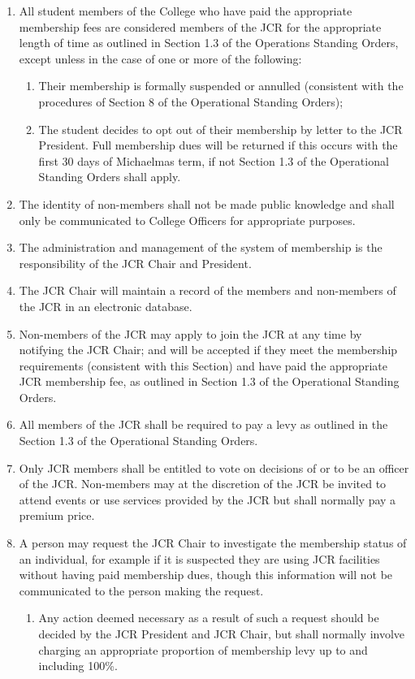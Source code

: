 \begin{enumerate}
    \item All student members of the College who have paid the appropriate membership fees are considered members of the JCR for the appropriate length of time as outlined in Section 1.3 of the Operations Standing Orders, except unless in the case of one or more of the following:
    \begin{enumerate}
        \item Their membership is formally suspended or annulled (consistent with the procedures of Section 8 of the Operational Standing Orders);
        \item The student decides to opt out of their membership by letter to the JCR President. Full membership dues will be returned if this occurs with the first 30 days of Michaelmas term, if not Section 1.3 of the Operational Standing Orders shall apply.
    \end{enumerate}
    \item The identity of non-members shall not be made public knowledge and shall only be communicated to College Officers for appropriate purposes.
    \item  The administration and management of the system of membership is the responsibility of the JCR Chair and President.
    \item The JCR Chair will maintain a record of the members and non-members of the JCR in an electronic database.
    \item Non-members of the JCR may apply to join the JCR at any time by notifying the JCR Chair; and will be accepted if they meet the membership requirements (consistent with this Section) and have paid the appropriate JCR membership fee, as outlined in Section 1.3 of the Operational Standing Orders.
    \item All members of the JCR shall be required to pay a levy as outlined in the Section 1.3 of the Operational Standing Orders. %
    \item Only JCR members shall be entitled to vote on decisions of or to be an officer of the JCR. Non-members may at the discretion of the JCR be invited to attend events or use services provided by the JCR but shall normally pay a premium price.
    \item A person may request the JCR Chair to investigate the membership status of an individual, for example if it is suspected they are using JCR facilities without having paid membership dues, though this information will not be communicated to the person making the request.
    \begin{enumerate}
        \item Any action deemed necessary as a result of such a request should be decided by the JCR President and JCR Chair, but shall normally involve charging an appropriate proportion of membership levy up to and including 100\%.
    \end{enumerate}
\end{enumerate}

